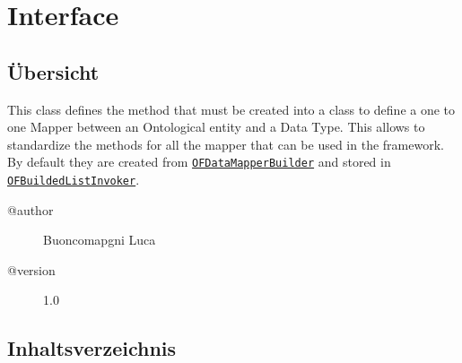 
\section[OFDataMapperInterface]{Interface }\label{ontologyFramework.OFDataMapping.OFDataMapperInterface<OntoEntity extends org.semanticweb.owlapi.model.OWLObject, R>-class}
\subsection{Übersicht}
This class defines the method that must be created into
 a class to define a one to one Mapper between an Ontological entity and
 a Data Type. This allows to standardize the methods for all
 the mapper that can be used in the framework. By default they are
 created from \texttt{\hyperlink{ontologyFramework.OFDataMapping.OFDataMapperBuilder-class}{OFDataMapperBuilder}} and stored in 
 \texttt{\hyperlink{ontologyFramework.OFRunning.OFInvokingManager.OFBuildedListInvoker-class}{OFBuildedListInvoker}}.
\begin{description}
\item[@author] 
Buoncomapgni Luca
\item[@version] 
1.0
\end{description}
\subsection{Inhaltsverzeichnis}
